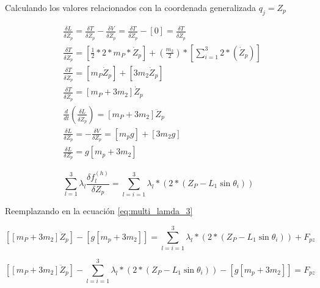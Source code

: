             
\newpage            
Calculando los valores relacionados con la coordenada generalizada  \( q_{j}=Z_{p} \) 
            
        \begin{align*}
             &\frac{ \delta L}{ \delta \dot{Z}_{p}}=\frac{ \delta T}{ \delta \dot{Z}_{p}}-\frac{ \delta V}{ \delta \dot{Z}_{p}}=\frac{ \delta T}{ \delta \dot{Z}_{p}}- \left[ 0 \right] =\frac{ \delta T}{ \delta \dot{Z}_{p}}\\
             &\frac{ \delta T}{ \delta \dot{Z}_{p}}= \left[ \frac{1}{2}\ast 2\ast    m_{P}\ast\dot{Z}_{p} \right] + \left( \frac{m_{2}}{2} \right) \ast \left[  \sum _{i=1}^{3}2\ast \left( \dot{Z}_{p} \right)  \right] \\
             &\frac{ \delta T}{ \delta \dot{Z}_{p}}= \left[ m_{P}\dot{Z}_{p} \right] + \left[ 3m_{2}\dot{Z}_{p} \right] \\
             &\frac{ \delta T}{ \delta \dot{Z}_{p}}= \left[ m_{P}+3m_{2} \right] \dot{Z}_{p}\\
             &\frac{d}{dt} \left( \frac{ \delta L}{ \delta \dot{Z}_{p}} \right) = \left[ m_{P}+3m_{2} \right] \ddot{Z}_{p} \\
             &\frac{ \delta L}{ \delta Z_{p}}=-\frac{ \delta V}{ \delta Z_{p}}= \left[ m_{p}g \right] + \left[ 3m_{2}g \right]  \\
             &\frac{ \delta L}{ \delta Z_{p}}=g \left[ m_{p}+3m_{2} \right] 
            \end{align*} 

             \[  \sum _{l=1}^{3} \lambda _{l}\frac{ \delta f_{l}^{ \left( h \right) }}{ \delta Z_{p}}= \sum _{l=i=1}^{3} \lambda _{l}\ast \left( 2\ast \left( Z_{P}-L_{1}\sin  \theta _{i} \right)  \right)  \] \par
            
            \begin{FlushLeft}
            Reemplazando en la ecuación \ref{eq:multi_lamda_3}
            \end{FlushLeft}\par
            
             \[  \left[  \left[ m_{P}+3m_{2} \right] \ddot{Z}_{p} \right] - \left[ g \left[ m_{p}+3m_{2} \right]  \right] = \sum _{l=i=1}^{3} \lambda _{l}\ast \left( 2\ast \left( Z_{P}-L_{1}\sin  \theta _{i} \right)  \right) +F_{pz} \] 
            
             \[  \left[  \left[ m_{P}+3m_{2} \right] \ddot{Z}_{p} \right] - \sum _{l=i=1}^{3} \lambda _{l}\ast \left( 2\ast \left( Z_{P}-L_{1}\sin  \theta _{i} \right)  \right) - \left[ g \left[ m_{p}+3m_{2} \right]  \right] =F_{pz} \] 
            
